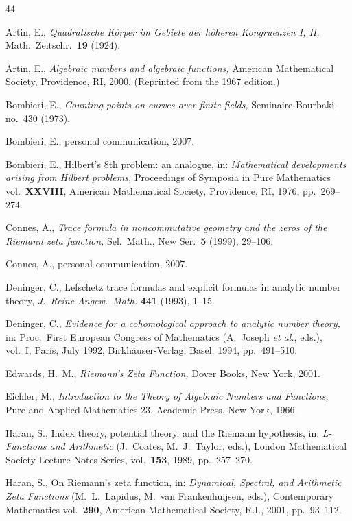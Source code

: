 \documentclass{amsart}
\theoremstyle{definition}\newtheorem{definition}[theorem]{Definition}
\theoremstyle{remark}\newtheorem{remark}[theorem]{Remark}
\numberwithin{equation}{section}
\begin{document}
\begin{thebibliography}{44}

	Artin, E.,
{\em Quadratische K\"orper im Gebiete der h\"oheren Kongruenzen I, II,\/} Math.\ Zeitschr.\ \textbf{19} (1924).

	Artin, E.,
{\em Algebraic numbers and algebraic functions,\/}
American Mathematical Society, Providence, RI, 2000. (Reprinted from the 1967 edition.)

	Bombieri, E.,
{\em Counting points on curves over finite fields,\/} Seminaire Bourbaki, no.~430 (1973).

	Bombieri, E.,
personal communication, 2007.

	Bombieri, E., Hilbert's 8th problem: an analogue,
in: {\em Mathematical developments arising from Hilbert problems,\/}
Proceedings of Symposia in Pure Mathematics vol.~\textbf{XXVIII},
American Mathematical Society, Providence, RI, 1976, pp.~269--274.

	Connes, A.,
{\em Trace formula in noncommutative geometry and the zeros of the Riemann zeta function,\/}
Sel.~Math., New Ser.~\textbf{5} (1999), 29--106.

	Connes, A.,
personal communication, 2007.

	Deninger, C.,
{Lefschetz trace formulas and explicit formulas in analytic number theory,\/}
\textit{J.\ Reine Angew.\ Math.} \textbf{441} (1993), 1--15.

	Deninger, C.,
\textit{Evidence for a cohomological approach to analytic number theory,\/}
in: Proc.\ First European Congress of Mathematics (A.\ Joseph \textit{et al.}, eds.), vol.\ I, Paris, July 1992,
Birkh\"auser-Verlag, Basel, 1994, pp.\ 491--510.

	Edwards, H.~M.,
\textit{Riemann's Zeta Function,\/} Dover Books, New York, 2001.

	Eichler, M.,
\textit{Introduction to the Theory of Algebraic Numbers and Functions,\/} Pure and Applied Mathematics 23, Academic Press, New York, 1966.

	Haran, S.,
Index theory, potential theory, and the Riemann hypothesis,
in: {\em L-Functions and Arithmetic} (J.~Coates, M.~J.~Taylor, eds.),
London Mathematical Society Lecture Notes Series, vol.~\textbf{153}, 1989, pp.~257--270.

	Haran, S.,
On Riemann's zeta function,
in: {\em Dynamical, Spectral, and Arithmetic Zeta Functions} (M.~L.~Lapidus, M.~van Frankenhuijsen, eds.),
Contemporary Mathematics vol.~\textbf{290}, American Mathematical Society, R.I., 2001, pp.~93--112.


\end{thebibliography}
\end{document}
